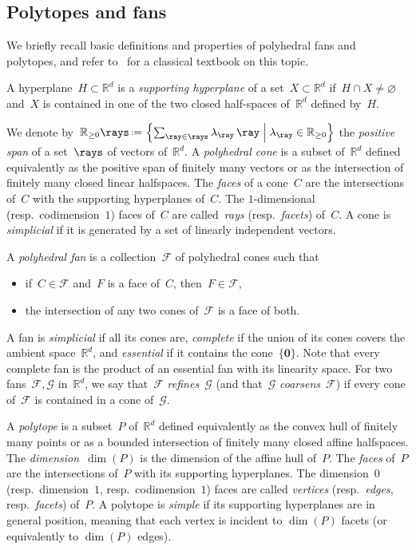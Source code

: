 \documentclass{amsart}
\theoremstyle{definition}
\newcommand{\R}{\mathbb{R}} %
\renewcommand{\c}[1]{{\mathcal{#1}}} %
\renewcommand{\b}[1]{{\boldsymbol{#1}}} %
\newcommand{\set}[2]{\left\{ #1 \;\middle|\; #2 \right\}} %
\newcommand{\eqdef}{\mbox{\,\raisebox{0.2ex}{\scriptsize\ensuremath{\mathrm:}}\ensuremath{=}\,}} %
\newcommand{\darkblue}{\color{darkblue}} %
\newcommand{\defn}[1]{\textsl{\darkblue #1}} %
\newcommand{\Fan}{\mathcal{F}} %
\begin{document}

\subsection{Polytopes and fans}

We briefly recall basic definitions and properties of polyhedral fans and polytopes, and refer to~\cite{Ziegler-polytopes} for a classical textbook on this topic.

A hyperplane~$H \subset \R^d$ is a \defn{supporting hyperplane} of a set~$X \subset \R^d$ if~$H \cap X \ne \varnothing$ and~$X$ is contained in one of the two closed half-spaces of~$\R^d$ defined by~$H$.

We denote by~$\R_{\ge0}\rays \eqdef \set{\sum_{\ray \in \rays} \lambda_{\ray} \, \ray}{\lambda_{\ray} \in \R_{\ge0}}$ the \defn{positive span} of a set~$\rays$ of vectors of~$\R^d$.
A \defn{polyhedral cone} is a subset of~$\R^d$ defined equivalently as the positive span of finitely many vectors or as the intersection of finitely many closed linear halfspaces.
The \defn{faces} of a cone~$C$ are the intersections of~$C$ with the supporting hyperplanes of~$C$.
The $1$-dimensional (resp.~codimension~$1$) faces of~$C$ are called~\defn{rays} (resp.~\defn{facets}) of~$C$.
A cone is \defn{simplicial} if it is generated by a set of linearly independent vectors.

A \defn{polyhedral fan} is a collection~$\Fan$ of polyhedral cones such that
\begin{itemize}
\item if~$C \in \Fan$ and~$F$ is a face of~$C$, then~$F \in \Fan$,
\item the intersection of any two cones of~$\Fan$ is a face of both.
\end{itemize}
A fan is \defn{simplicial} if all its cones are, \defn{complete} if the union of its cones covers the ambient space~$\R^d$, and \defn{essential} if it contains the cone~$\{\b{0}\}$. Note that every complete fan is the product of an essential fan with its linearity space.
For two fans~$\Fan, \c{G}$ in~$\R^d$, we say that~$\Fan$ \defn{refines}~$\c{G}$ (and that~$\c{G}$ \defn{coarsens}~$\Fan$) if every cone of~$\Fan$ is contained in a cone of~$\c{G}$.

A \defn{polytope} is a subset~$P$ of~$\R^d$ defined equivalently as the convex hull of finitely many points or as a bounded intersection of finitely many closed affine halfspaces.
The \defn{dimension}~$\dim(P)$ is the dimension of the affine hull of~$P$.
The \defn{faces} of~$P$ are the intersections of~$P$ with its supporting hyperplanes.
The dimension~$0$ (resp.~dimension~$1$, resp.~codimension~$1$) faces are called \defn{vertices} (resp.~\defn{edges}, resp.~\defn{facets}) of~$P$.
A polytope is \defn{simple} if its supporting hyperplanes are in general position, meaning that each vertex is incident to $\dim(P)$ facets (or equivalently to $\dim(P)$ edges).
\end{document}
